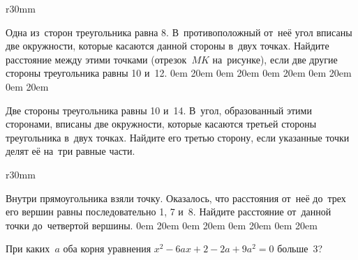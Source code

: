 \begin{wrapfigure}[0]{r}{30mm}
\vspace{-15mm}
\end{wrapfigure}

\noindent
Одна из~сторон треугольника равна 8. В~противоположный от~неё угол вписаны две окружности, которые касаются данной стороны в~двух точках. Найдите расстояние между этими точками (отрезок~$MK$ на~рисунке), если две другие стороны треугольника равны 10 и~12.
 0em 20em 0em 20em 0em 20em 0em 20em 0em 20em

Две стороны треугольника равны 10 и~14. В~угол, образованный этими сторонами, вписаны две окружности, которые касаются третьей стороны треугольника в~двух точках. Найдите его третью сторону, если указанные точки делят её на~три равные части.

\begin{wrapfigure}[0]{r}{30mm}
\vspace{-8mm}
\end{wrapfigure}

Внутри прямоугольника взяли точку. Оказалось, что расстояния от~неё до~трех его вершин равны последовательно 1, 7 и~8. Найдите расстояние от~данной точки до~четвертой вершины.
 0em 20em 0em 20em 0em 20em 0em 20em

При каких~$a$ оба корня уравнения $x^2 - 6ax + 2 -2a + 9a^2 = 0$ больше~3?

